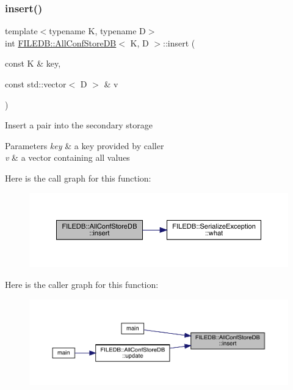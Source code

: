 \subsubsection{\texorpdfstring{insert()}{insert()}\hspace{0.1cm}{\footnotesize\ttfamily [1/3]}}
{\footnotesize\ttfamily template$<$typename K, typename D$>$ \\
int \mbox{\hyperlink{classFILEDB_1_1AllConfStoreDB}{F\+I\+L\+E\+D\+B\+::\+All\+Conf\+Store\+DB}}$<$ K, D $>$\+::insert (\begin{DoxyParamCaption}\item[{const K \&}]{key,  }\item[{const std\+::vector$<$ D $>$ \&}]{v }\end{DoxyParamCaption})\hspace{0.3cm}{\ttfamily [inline]}}

Insert a pair into the secondary storage 
\begin{DoxyParams}{Parameters}
{\em key} & a key provided by caller \\
\hline
{\em v} & a vector containing all values \\
\hline
\end{DoxyParams}
Here is the call graph for this function\+:
\nopagebreak
\begin{figure}[H]
\begin{center}
\leavevmode
\includegraphics[width=350pt]{df/db6/classFILEDB_1_1AllConfStoreDB_abf4a1ccd7306de436ba1ec61b242e02f_cgraph}
\end{center}
\end{figure}
Here is the caller graph for this function\+:
\nopagebreak
\begin{figure}[H]
\begin{center}
\leavevmode
\includegraphics[width=350pt]{df/db6/classFILEDB_1_1AllConfStoreDB_abf4a1ccd7306de436ba1ec61b242e02f_icgraph}
\end{center}
\end{figure}
\mbox{\label{classFILEDB_1_1AllConfStoreDB_abf4a1ccd7306de436ba1ec61b242e02f}} 
